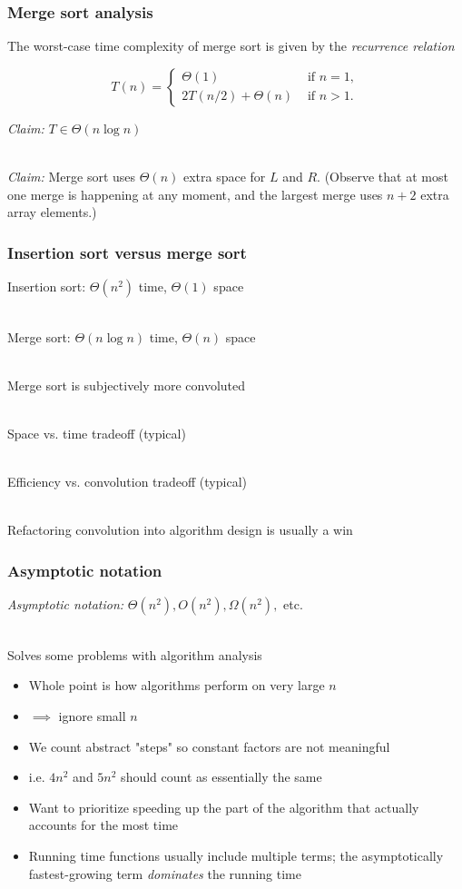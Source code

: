 \documentclass{beamer}
\newcommand{\stanza}{ \\~\ }
\begin{document}
\begin{frame} \frametitle{Merge sort analysis}
  The worst-case time complexity of merge sort is given by the
  \emph{recurrence relation}

  \begin{equation*}
    T(n) = \begin{cases}
            \Theta(1) & \text{ if } n=1, \\
            2 T(n/2) + \Theta(n) & \text{ if } n > 1 .
          \end{cases}
  \end{equation*}

  \emph{Claim:} $T \in \Theta(n \log n)$ \stanza

  \emph{Claim:} Merge sort uses $\Theta(n)$ extra space for $L$ and $R.$
  (Observe that at most one merge is happening at any moment, and the largest
   merge uses $n+2$ extra array elements.)
\end{frame}

\begin{frame} \frametitle{Insertion sort versus merge sort}
  Insertion sort: $\Theta(n^2)$ time, $\Theta(1)$ space \stanza

  Merge sort: $\Theta(n \log n)$ time, $\Theta(n)$ space \stanza

  Merge sort is subjectively more convoluted \stanza

  Space vs. time tradeoff (typical) \stanza

  Efficiency vs. convolution tradeoff (typical) \stanza

  Refactoring convolution into algorithm design is usually a win

\end{frame}

\begin{frame} \frametitle{Asymptotic notation}
\emph{Asymptotic notation:} $\Theta(n^2), O(n^2), \Omega(n^2),$ etc. \stanza

Solves some problems with algorithm analysis
\begin{itemize}
  \item Whole point is how algorithms perform on very large $n$
  \item $\implies$ ignore small $n$
  \item We count abstract "steps" so constant factors are not meaningful
  \item i.e. $4n^2$ and $5n^2$ should count as essentially the same
  \item Want to prioritize speeding up the part of the algorithm that actually
    accounts for the most time
  \item Running time functions usually include multiple terms; the
    asymptotically fastest-growing term \emph{dominates} the running time
\end{itemize}
\end{frame}
\end{document}
